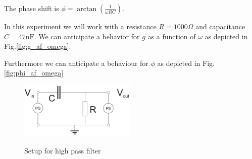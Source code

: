 \documentclass[../main/main.tex]{subfiles}
\begin{document}
The phase shift is \( \phi = \arctan( \frac{1}{ \omega RC })\).

In this experiment we will work with a resistance \( R = 1000 \Omega \) and capacitance \( C = 47 \si{\nano\farad} \).
We can anticipate a behavior for \( g \) as a function of \( \omega \) as depicted in Fig.\ref{fig:g_af_omega}.

Furthermore we can anticipate a behaviour for \( \phi \) as depicted in Fig.\ref{fig:phi_af_omega}

\begin{figure}[!ht]
  \caption{Setup for high pass filter}
  \centering
    \includegraphics[width=0.5\textwidth]{../img/setup.png}
    \label{fig:setup}
\end{figure}
\end{document}
